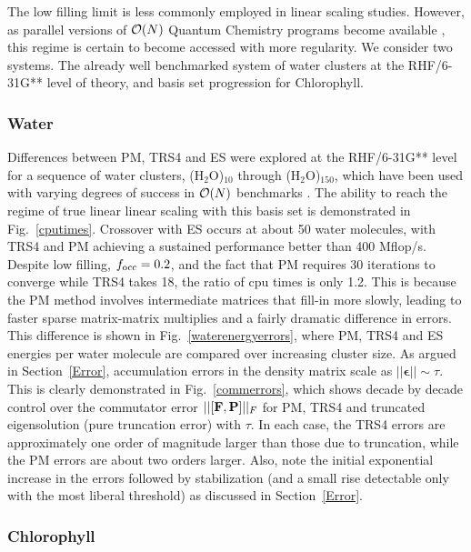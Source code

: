 \commentoutA{\documentclass[prb,aps,twocolumn,showpacs,twocolumngrid,superbib]{revtex4}}
\begin{document}
The low filling limit is less commonly employed in linear scaling studies.  However, as parallel versions
of ${\cal O}(N)$ Quantum Chemistry programs become available \cite{MChallacombe00B,CGan03}, this regime 
is certain to become accessed with more regularity.  We consider two systems.  The already well benchmarked 
system of water clusters at the RHF/6-31G** level of theory, and basis set progression for Chlorophyll.

\subsubsection{Water}

Differences between PM, TRS4 and ES were explored at the RHF/6-31G** level for a sequence 
of water clusters, (H$_2$O)$_{10}$ through (H$_2$O)$_{150}$, which have been used with varying degrees of success in ${\cal O}(N)$ benchmarks
\cite{ADaniels97,JMillam97,MChallacombe96,MChallacombe97,ESchwegler97,ESchwegler99,MChallacombe96A,JBurant96,COchsenfeld98,YShao01}.
The ability to reach the regime of true linear linear scaling with this basis set is demonstrated in Fig.~\ref{cputimes}.
Crossover with ES occurs at about 50 water molecules, with {\sc TRS4} and {\sc PM} achieving a sustained 
performance better than 400 Mflop/s.  Despite low filling, $f_{\rm occ}=0.2$, and the fact that PM 
requires 30 iterations to converge while TRS4 takes 18, the ratio of cpu times is only 1.2.  
This is because the PM method involves intermediate matrices that fill-in more slowly, leading to 
faster sparse matrix-matrix multiplies and a fairly dramatic difference in errors.  
This difference is shown in Fig.~\ref{waterenergyerrors}, where PM, TRS4 and ES energies per water molecule 
are compared over increasing cluster size.  As argued in Section~\ref{Error}, accumulation errors 
in the density matrix scale as $||{\bm\epsilon}||\sim \tau$. This is clearly demonstrated in 
Fig.~\ref{commerrors}, which shows decade by decade control over the commutator error 
$||[{\bf F,P}]||_F$ for PM, TRS4 and truncated eigensolution (pure truncation error) with $\tau$. 
In each case, the TRS4 errors are approximately one order of magnitude larger than those due to 
truncation, while the PM errors are about two orders larger.  Also, note the initial exponential  
increase in the errors followed by stabilization (and a small rise detectable only with the 
most liberal threshold) as discussed in Section~\ref{Error}.

\subsubsection{Chlorophyll}
 
\end{document}
